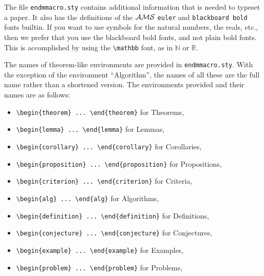 \documentclass{endm}
\newcommand{\Nat}{{\mathbb N}}
\newcommand{\Real}{{\mathbb R}}
\begin{document}
The file \texttt{endmmacro.sty} contains additional information that is
needed to typeset a paper. It also has the definitions of the $\cal AMS$
\texttt{euler} and \texttt{blackboard bold} fonts builtin. If you want to
use symbols for the natural numbers, the reals, etc., then we prefer that
you use the blackboard bold fonts, and not plain bold fonts. This is
accomplished by using the \verb+\mathbb+ font, as in $\Nat$ or $\Real$.

The names of theorem-like environments are provided in
\texttt{endmmacro.sty}. With the exception of the environment
``Algorithm'', the names of all these are the full name rather than a
shortened version. The environments provided and their names are as
follows:
\begin{itemize}
\item \verb+\begin{theorem} ... \end{theorem}+ for Theorems,
\item \verb+\begin{lemma} ... \end{lemma}+ for Lemmas,
\item \verb+\begin{corollary} ... \end{corollary}+ for Corollaries,
\item \verb+\begin{proposition} ... \end{proposition}+ for Propositions,
\item \verb+\begin{criterion} ... \end{criterion}+ for Criteria,
\item \verb+\begin{alg} ... \end{alg}+ for Algorithms,
\item \verb+\begin{definition} ... \end{definition}+ for Definitions,
\item \verb+\begin{conjecture} ... \end{conjecture}+ for Conjectures,
\item \verb+\begin{example} ... \end{example}+ for Examples,
\item \verb+\begin{problem} ... \end{problem}+ for Problems,

\end{itemize}
\end{document}
